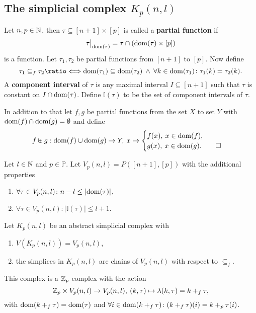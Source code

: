 \subsection{The simplicial complex $K_p(n, l)$}

\begin{defin}
  Let $n, p \in \mathbb{N}$, then $\tau \subseteq [n+1] \times [p]$ is called a \textbf{partial function} if \[\restr{\tau}{\dom(\tau)} = \tau \cap (\dom(\tau) \times [p])\] is a function. Let $\tau_1, \tau_2$ be partial functions from $[n+1]$ to $[p]$. Now define
  \begin{equation*}
    \tau_1 \subseteq_f \tau_2 \longeq \dom(\tau_1) \subseteq \dom(\tau_2) \: \land \: \forall k \in \dom(\tau_1)\colon \tau_1(k) = \tau_2(k).
  \end{equation*}
  A \textbf{component interval} of $\tau$ is any maximal interval $I \subseteq [n+1]$ such that $\tau$ is constant on $I \cap {\rm dom}(\tau)$. Define $\mathbb{I}(\tau)$ to be the set of component intervals of $\tau$. 

  In addition to that let $f, g$ be partial functions from the set $X$ to set $Y$ with ${\rm dom}(f) \cap {\rm dom}(g) = \emptyset$ and define 
  \begin{equation*}
    f \uplus g: {\rm dom}(f) \cup {\rm dom}(g) \to Y, \: x \mapsto \begin{cases}
      f(x), \: x \in {\rm dom}(f), \\
      g(x), \: x \in {\rm dom}(g).\qedhere
    \end{cases}
  \end{equation*}
\end{defin}

\begin{defin}
  Let $l \in \mathbb{N}$ and $p \in \mathbb{P}$. Let $V_p(n, l) = P([n+1], [p])$ with the additional properties
  \begin{enumerate}[label=\roman*.)]
    \item $\forall \tau \in V_p(n,l)\colon n - l \leq |{\rm dom}(\tau)|$,
    \item $\forall \tau \in V_p(n,l)\colon \left|\mathbb{I}(\tau)\right| \leq l+1$.\qedhere
  \end{enumerate}
\end{defin}

\begin{defin}\label{defin:kpnl}
  Let $K_p(n,l)$ be an abstract simplicial complex with
  \begin{enumerate}[label=\roman*.)]
    \item $V(K_p(n,l)) = V_p(n,l)$,
    \item the simplices in $K_p(n,l)$ are chains of $V_p(n,l)$ with respect to $\subseteq_f$.
  \end{enumerate}
  This complex is a $\mathbb{Z}_p$ complex with the action
  \begin{equation*}
    \mathbb{Z}_p \times V_p(n,l) \to V_p(n,l), \: (k, \tau) \mapsto \lambda(k, \tau) = k +_f \tau,
  \end{equation*}
  with ${\rm dom}(k +_f \tau) = {\rm dom}(\tau)$ and $\forall i\in {\rm dom}(k +_f \tau)\colon (k+_f\tau)(i) = k +_p \tau(i)$.\qedhere
\end{defin}

